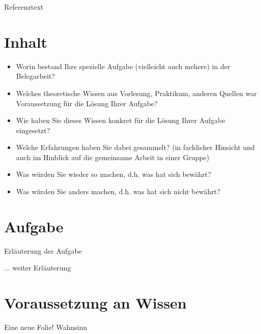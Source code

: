 \documentclass[ignorenonframetext, 11pt, table]{beamer}
\begin{document}
\begin{frame}
Referenztext\\
$ $\\
$ $\\
$ $\\
$ $
\end{frame}


\section*{Inhalt}
\begin{frame}
\begin{itemize}
\setlength\itemsep{0.2em}
\item Worin bestand Ihre spezielle  Aufgabe (vielleicht auch mehere)  in der Belegarbeit?
\item Welches theoretische Wissen aus Vorlesung, Praktikum, anderen Quellen  war Voraussetzung für die Lösung Ihrer Aufgabe?
\item Wie haben Sie dieses Wissen konkret für die Lösung Ihrer Aufgabe eingesetzt?
\item Welche Erfahrungen haben Sie dabei gesammelt? (in fachlicher Hinsicht und auch im Hinblick auf die gemeinsame Arbeit in einer Gruppe)
\item Was würden Sie wieder so machen, d.h. was hat sich bewährt?   
\item Was würden Sie anders machen, d.h. was hat sich nicht bewährt?
\end{itemize}
\end{frame}

\section*{Aufgabe}
\begin{frame}
Erläuterung der Aufgabe
\end{frame}
\begin{frame}
... weiter Erläuterung
\end{frame}

\section*{Voraussetzung an Wissen}
\begin{frame}
Eine neue Folie! Wahnsinn
\end{frame}
\end{document}
